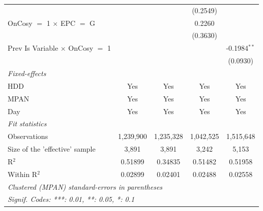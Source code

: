 \begin{table}[htbp]
\begin{tabular}{lcccc}
                                              &                 &                 & (0.2549)       &   \\   
      OnCosy $=$ 1 $\times$ EPC $=$ G         &                 &                 & 0.2260         &   \\   
                                              &                 &                 & (0.3630)       &   \\   
      Prev Is Variable $\times$ OnCosy $=$ 1  &                 &                 &                & -0.1984$^{**}$\\   
                                              &                 &                 &                & (0.0930)\\   
      \midrule
      \emph{Fixed-effects}\\
      HDD                                     & Yes             & Yes             & Yes            & Yes\\  
      MPAN                                    & Yes             & Yes             & Yes            & Yes\\  
      Day                                     & Yes             & Yes             & Yes            & Yes\\  
      \midrule
      \emph{Fit statistics}\\
      Observations                            & 1,239,900       & 1,235,328       & 1,042,525      & 1,515,648\\  
      Size of the 'effective' sample          & 3,891           & 3,891           & 3,242          & 5,153\\  
      R$^2$                                   & 0.51899         & 0.34835         & 0.51482        & 0.51958\\  
      Within R$^2$                            & 0.02899         & 0.02401         & 0.02488        & 0.02558\\  
      \midrule \midrule
      \multicolumn{5}{l}{\emph{Clustered (MPAN) standard-errors in parentheses}}\\
      \multicolumn{5}{l}{\emph{Signif. Codes: ***: 0.01, **: 0.05, *: 0.1}}\\
   \end{tabular}
\end{table}


